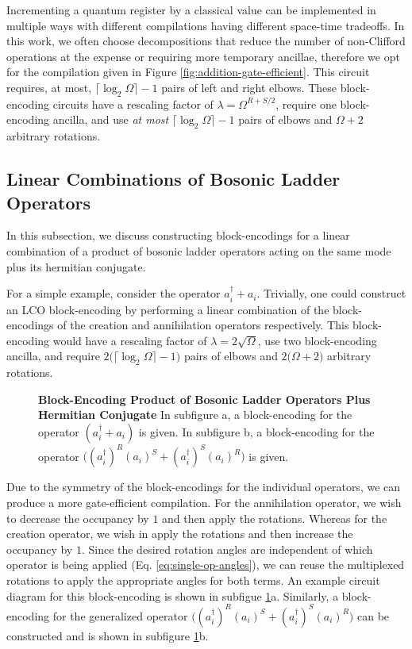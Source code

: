 Incrementing a quantum register by a classical value can be implemented in multiple ways with different compilations having different space-time tradeoffs.
In this work, we often choose decompositions that reduce the number of non-Clifford operations at the expense or requiring more temporary ancillae, therefore we opt for the compilation given in Figure \ref{fig:addition-gate-efficient}.
This circuit requires, at most, $\lceil \log_2 \Omega \rceil - 1$ pairs of left and right elbows.
These block-encoding circuits have a rescaling factor of $\lambda = \Omega^{R+S/2}$, require one block-encoding ancilla, and use \textit{at most} $\lceil \log_2 \Omega \rceil - 1$ pairs of elbows and $\Omega + 2$ arbitrary rotations.


\subsection{Linear Combinations of Bosonic Ladder Operators}

In this subsection, we discuss constructing block-encodings for a linear combination of a product of bosonic ladder operators acting on the same mode plus its hermitian conjugate.

For a simple example, consider the operator $a_i^\dagger + a_i$.
Trivially, one could construct an LCO block-encoding by performing a linear combination of the block-encodings of the creation and annihilation operators respectively.
This block-encoding would have a rescaling factor of $\lambda = 2\sqrt{\Omega}$, use two block-encoding ancilla, and require $2\big(\lceil \log_2 \Omega \rceil - 1\big)$ pairs of elbows and $2 \big(\Omega + 2\big)$ arbitrary rotations.


\begin{figure}
    
    
    \caption{
        \textbf{Block-Encoding Product of Bosonic Ladder Operators Plus Hermitian Conjugate}
        In subfigure a, a block-encoding for the operator $(a_i^\dagger + a_i)$ is given.
        In subfigure b, a block-encoding for the operator $\big((a_i^\dagger)^R (a_i)^S + (a_i^\dagger)^S (a_i)^R\big)$ is given.
    }
    \label{fig:lc-bosonic}
\end{figure}


Due to the symmetry of the block-encodings for the individual operators, we can produce a more gate-efficient compilation.
For the annihilation operator, we wish to decrease the occupancy by $1$ and then apply the rotations.
Whereas for the creation operator, we wish in apply the rotations and then increase the occupancy by $1$.
Since the desired rotation angles are independent of which operator is being applied (Eq. \ref{eq:single-op-angles}), we can reuse the multiplexed rotations to apply the appropriate angles for both terms.
An example circuit diagram for this block-encoding is shown in subfigue \ref{fig:lc-bosonic}a.
Similarly, a block-encoding for the generalized operator $\big((a_i^\dagger)^R (a_i)^S + (a_i^\dagger)^S (a_i)^R\big)$ can be constructed and is shown in subfigure \ref{fig:lc-bosonic}b.

